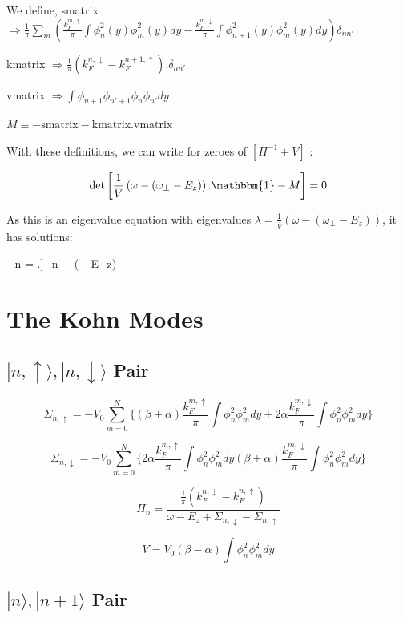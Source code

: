 We define, smatrix $\Rightarrow \frac{1}{\pi} \sum\limits_m \left( \frac{k_F^{m,\uparrow}}{\pi}\int\phi_n^2(y)\phi_m^2(y)dy - \frac{k_F^{m,\downarrow}}{\pi}\int\phi_{n+1}^2(y)\phi_m^2(y)dy \right)\delta_{nn'}$

kmatrix $\Rightarrow \frac{1}{\pi} \left(k_F^{n,\downarrow}-k_F^{n+1,\uparrow} \right).\delta_{nn'}$

vmatrix $\Rightarrow \int\phi_{n+1}\phi_{n'+1}\phi_n\phi_{n'} dy $

$M\equiv \mathrm{-smatrix-kmatrix.vmatrix} $

With these definitions, we can write for zeroes of $\left[ \Pi^{-1}+V\right]$ : 

\[ \mathrm{det} \left[ \frac{1}{\overline{V}} \left( \omega-(\omega_{\perp}-E_z) \right).\mathbbm{1}-M \right] =0  \]

As this is an eigenvalue equation with eigenvalues $\lambda = \frac{1}{\overline{V}} \left( \omega-(\omega_{\perp}-E_z) \right)$, it has solutions:

\be \omega_n = .\left[ \mathrm{Eigenvalues}[M] \right]_n + (\omega_{\perp}-E_z) \ee
\section{The Kohn Modes}

\subsection{$|n,\uparrow\rangle, |n,\downarrow\rangle$ Pair}

\[\Sigma_{n,\uparrow}=-V_0 \sum\limits_{m=0}^N \{(\beta+\alpha) \frac{k_F^{m,\uparrow}}{\pi} \int\phi_n^2\phi_m^2 dy + 2\alpha \frac{k_F^{m,\downarrow}}{\pi} \int \phi_n^2 \phi_m^2 dy\}\]

\[\Sigma_{n,\downarrow}=-V_0 \sum\limits_{m=0}^N \{2\alpha \frac{k_F^{m,\uparrow}}{\pi} \int\phi_n^2\phi_m^2dy (\beta+\alpha) \frac{k_F^{m,\downarrow}}{\pi} \int\phi_n^2\phi_m^2dy\}\]

\[\Pi_n=\frac{\frac{1}{\pi}(k_F^{n,\downarrow}-k_F^{n,\uparrow})}{\omega-E_z + \Sigma_{n,\downarrow}-\Sigma_{n,\uparrow}}\]

\[V=V_0 (\beta-\alpha) \int\phi_n^2\phi_m^2dy\]

\subsection{$|n\rangle, |n+1\rangle$ Pair}

